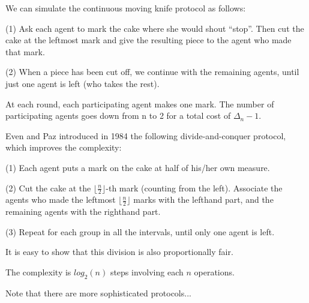 We can simulate the continuous moving knife protocol as follows:

(1) Ask each agent to mark the cake where she would shout “stop”.
Then cut the cake at the leftmost mark and give the resulting piece to the agent who made that mark.

(2) When a piece has been cut off, we continue with the remaining agents, until just one agent is left (who takes the rest).

At each round, each participating agent makes one mark. The number of participating agents goes down from n to 2 
for a total cost of $\Delta_n -1$.

\bigskip

Even and Paz introduced in 1984 the following divide-and-conquer protocol,
which improves the complexity:

(1) Each agent puts a mark on the cake at half of his/her own measure. 

(2) Cut the cake at the $\lfloor \frac{n}{2} \rfloor$-th mark (counting from the left). 
Associate the agents who made the leftmost $\lfloor \frac{n}{2} \rfloor$ marks with the 
lefthand part, and the remaining agents with the righthand part. 

(3) Repeat for each group in all the intervals, until only one agent is left.

It is easy to show that this division is also proportionally fair.

The complexity is $log_2(n)$ steps involving each $n$ operations. 
\bigskip

Note that there are more sophisticated protocols...




